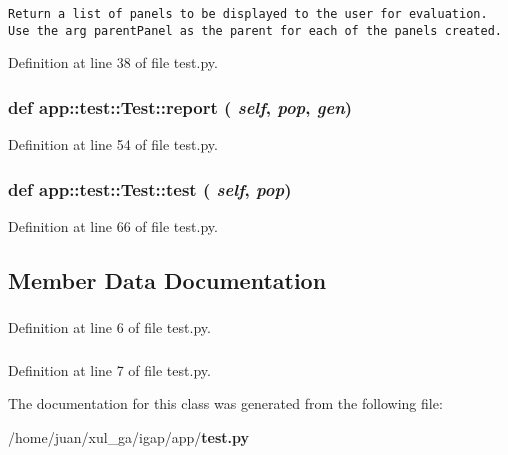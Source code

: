 \footnotesize\begin{verbatim}
Return a list of panels to be displayed to the user for evaluation.
Use the arg parentPanel as the parent for each of the panels created.
\end{verbatim}
\normalsize
 

Definition at line 38 of file test.py.
\subsubsection{\setlength{\rightskip}{0pt plus 5cm}def app::test::Test::report ( {\em self},  {\em pop},  {\em gen})}\label{classapp_1_1test_1_1Test_b17bd379337c1aad182d111d595ea770}




Definition at line 54 of file test.py.
\subsubsection{\setlength{\rightskip}{0pt plus 5cm}def app::test::Test::test ( {\em self},  {\em pop})}\label{classapp_1_1test_1_1Test_53ab6b5b39ac4ab37dacaffae4e3e13b}




Definition at line 66 of file test.py.

\subsection{Member Data Documentation}
\subsubsection{}\label{classapp_1_1test_1_1Test_44017508229274cc17c8ca160c71deae}




Definition at line 6 of file test.py.
\subsubsection{}\label{classapp_1_1test_1_1Test_342fdcd0287cca5f68bf46d6a210fc99}




Definition at line 7 of file test.py.

The documentation for this class was generated from the following file:\begin{CompactItemize}
\item 
/home/juan/xul\_\-ga/igap/app/{\bf test.py}\end{CompactItemize}
